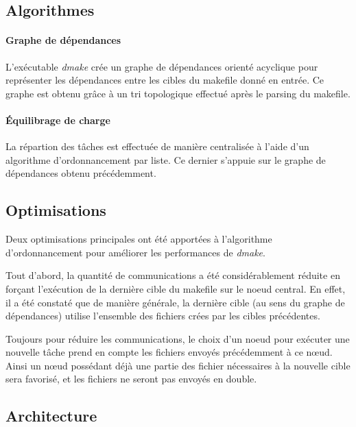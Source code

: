 \documentclass[a4paper,12pt,twoside]{article}
\begin{document}
\subsection{Algorithmes}

\paragraph{Graphe de dépendances}

L'exécutable \emph{dmake} crée un graphe de dépendances orienté
acyclique pour représenter les dépendances entre les cibles du
makefile donné en entrée. Ce graphe est obtenu grâce à un tri
topologique effectué après le parsing du makefile.

\paragraph{Équilibrage de charge}

La répartion des tâches est effectuée de manière centralisée à l'aide
d'un algorithme d'ordonnancement par liste. Ce dernier s'appuie sur le
graphe de dépendances obtenu précédemment.

\subsection{Optimisations}

Deux optimisations principales ont été apportées à l'algorithme
d'ordonnancement pour améliorer les performances de \emph{dmake}.

Tout d'abord, la quantité de communications a été considérablement
réduite en forçant l'exécution de la dernière cible du makefile sur le
noeud central. En effet, il a été constaté que de manière générale, la
dernière cible (au sens du graphe de dépendances) utilise l'ensemble
des fichiers crées par les cibles précédentes.

Toujours pour réduire les communications, le choix d'un noeud pour
exécuter une nouvelle tâche prend en compte les fichiers envoyés
précédemment à ce nœud. Ainsi un nœud possédant déjà une partie des
fichier nécessaires à la nouvelle cible sera favorisé, et les fichiers
ne seront pas envoyés en double.

\subsection{Architecture}
\end{document}
